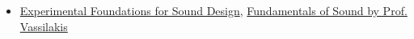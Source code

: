 \begin{itemize}[noitemsep,topsep=0pt,leftmargin=*]
      \item {} \href{https://www.kadenze.com/courses/experimental-foundations-for-sound-design/info}{Experimental Foundations for Sound Design}, \href{http://www.acousticslab.org/RECA220/}{Fundamentals of Sound by Prof. Vassilakis}
\end{itemize}